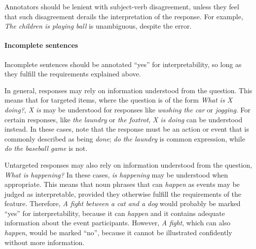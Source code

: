 \documentclass[12pt,notitlepage]{article}
\begin{document}
Annotators should be lenient with subject-verb disagreement, unless they feel that such disagreement derails the interpretation of the response. For example, \textit{The children is playing ball} is unambiguous, despite the error.




\paragraph{Incomplete sentences} \label{para:interp-incomplete} Incomplete sentences should be annotated ``yes'' for interpretability, so long as they fulfill the requirements explained above.

In general, responses may rely on information understood from the question. This means that for targeted items, where the question is of the form \textit{What is X doing?}, \textit{X is} may be understood for responses like \textit{washing the car} or \textit{jogging}. For certain responses, like \textit{the laundry} or \textit{the foxtrot}, \textit{X is doing} can be understood instead. In these cases, note that the response must be an action or event that is commonly described as being \textit{done}; \textit{do the laundry} is common expression, while \textit{do the baseball game} is not. 

Untargeted responses may also rely on information understood from the question, \textit{What is happening?} In these cases, \textit{is happening} may be understood when appropriate. This means that noun phrases that can \textit{happen} as events may be judged as interpretable, provided they otherwise fulfill the requirements of the feature. Therefore, \textit{A fight between a cat and a dog} would probably be marked ``yes'' for interpretability, because it can \textit{happen} and it contains adequate information about the event participants. However, \textit{A fight}, which can also \textit{happen}, would be marked ``no'', because it cannot be illustrated confidently without more information.

\end{document}
